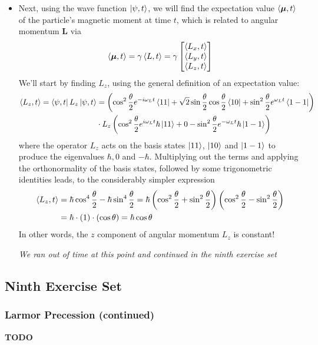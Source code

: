 \documentclass[11pt, a4paper]{article}
\renewcommand{\vec}[1]{\bm{#1}} %
\newcommand{\m}{\vec{\mu}}  %
\begin{document}
\begin{itemize}
	\item Next, using the wave function $ \ket{\psi, t} $, we will find the expectation value $ \ev{\m, t} $ of the particle's magnetic moment at time $ t $, which is related to angular momentum $ \vec{L} $ via
	\begin{equation*}
		\ev{\m, t} = \gamma \ev{L, t} = \gamma
		\begin{bmatrix}
			\ev{L_{x}, t}\\
			\ev{L_{y}, t}\\
			\ev{L_{z}, t}
		\end{bmatrix}
	\end{equation*}
	We'll start by finding $ L_{z} $, using the general definition of an expectation value:
	\begin{align*}
		\ev{L_{z}, t} = \bra{\psi, t}L_{z}\ket{\psi, t} &= \left(\cos^{2} \frac{\theta}{2} e^{-i \omega_{L} t}\bra{11} + \sqrt{2}\sin \frac{\theta}{2} \cos \frac{\theta}{2} \bra{10} + \sin^{2}\frac{\theta}{2} e^{\omega_{L} t}\bra{1 -1}\right) \\
		&\cdot L_{z}\left(\cos^{2} \frac{\theta}{2} e^{i \omega_{L} t}\hbar\ket{11} + 0 - \sin^{2}\frac{\theta}{2} e^{-\omega_{L} t}\hbar\ket{1 -1}\right)
	\end{align*}
	where the operator $ L_{z} $ acts on the basis states $ \ket{11} $, $ \ket{10} $ and $ \ket{1-1} $ to produce the eigenvalues $ \hbar, 0 $ and $ -\hbar $. Multiplying out the terms and applying the orthonormality of the basis states, followed by some trigonometric identities leads, to the considerably simpler expression
	\begin{align*}
		\ev{L_{z}, t} &= \hbar \cos^{4}\frac{\theta}{2} - \hbar \sin^{4}\frac{\theta}{2} = \hbar\left(\cos^{2}\frac{\theta}{2} +  \sin^{2}\frac{\theta}{2}\right)\left(\cos^{2}\frac{\theta}{2} -  \sin^{2}\frac{\theta}{2}\right)\\
		&=\hbar\cdot (1) \cdot (\cos \theta) = \hbar \cos \theta
	\end{align*}
	In other words, the $ z $ component of angular momentum $ L_{z} $ is constant!
	
	\textit{We ran out of time at this point and continued in the ninth exercise set}
	
\end{itemize}

\subsection{Ninth Exercise Set}
\subsubsection{Larmor Precession (continued)}
\textbf{TODO}
\end{document}
